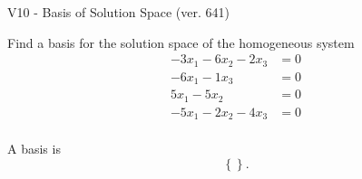 \begin{exercise}
  \begin{exerciseTitle}V10 - Basis of Solution Space (ver. 641)\end{exerciseTitle}
  \begin{exerciseStatement}
    Find a basis for the solution space of the homogeneous system 
\begin{align*}
 -3 x_ 1 -6 x_ 2 -2 x_ 3 &= 0  \\ 
  -6 x_ 1 -1 x_ 3 &= 0  \\ 
  5 x_ 1 -5 x_ 2 &= 0  \\ 
  -5 x_ 1 -2 x_ 2 -4 x_ 3 &= 0  \\ 
 \end{align*}


 
  \end{exerciseStatement}

  \begin{exerciseAnswer}
   A basis is   
\[\left\{\right\}.\]

  


  \end{exerciseAnswer}
\end{exercise}